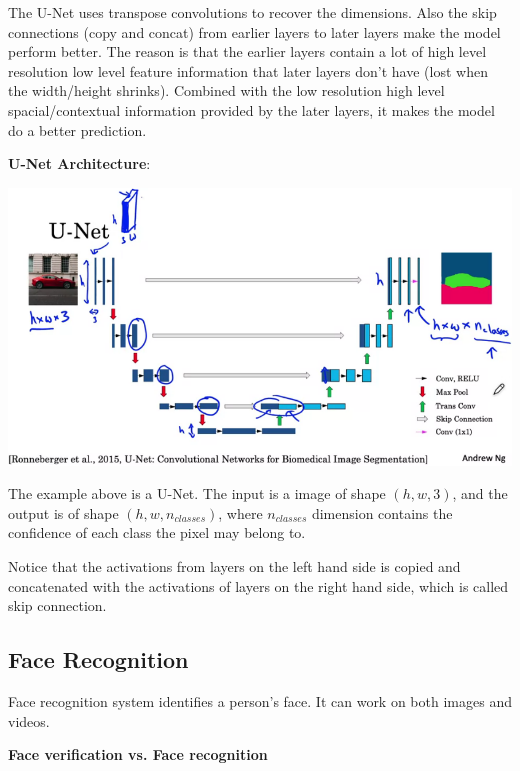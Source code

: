 \documentclass{article}
\begin{document}
\noindent The U-Net uses transpose convolutions to recover the dimensions. Also the skip connections (copy and concat) from earlier layers to later layers make the model perform better. The reason is that the earlier layers contain a lot of high level resolution low level feature information that later layers don't have (lost when the width/height shrinks). Combined with the low resolution high level spacial/contextual information provided by the later layers, it makes the model do a better prediction.

\bigskip

\noindent \textbf{U-Net Architecture}:

\begin{center}
\includegraphics[scale=0.4]{./images/unet_architecture.png}
\end{center}

\noindent The example above is a U-Net. The input is a image of shape \((h, w, 3)\), and the output is of shape \((h, w, n_{classes})\), where \(n_{classes}\) dimension contains the confidence of each class the pixel may belong to.

\bigskip

\noindent Notice that the activations from layers on the left hand side is copied and concatenated with the activations of layers on the right hand side, which is called skip connection.

\subsection{Face Recognition}

\noindent Face recognition system identifies a person's face. It can work on both images and videos.

\bigskip

\noindent \textbf{Face verification vs. Face recognition}
\end{document}
